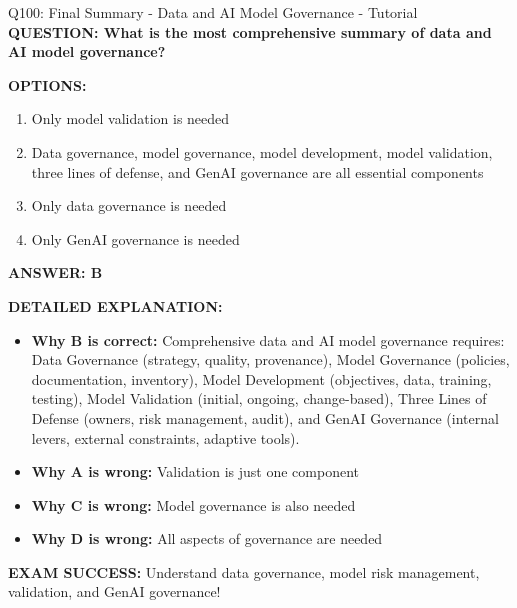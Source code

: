 \documentclass[8pt]{beamer}
\begin{document}
	\begin{frame}{Q100: Final Summary - Data and AI Model Governance - Tutorial}
		\fontsize{6.5}{7.5}\selectfont
		\textbf{QUESTION: What is the most comprehensive summary of data and AI model governance?}
		
		\vspace{0.1cm}
		\textbf{OPTIONS:}
		\begin{enumerate}
			\item Only model validation is needed
			\item Data governance, model governance, model development, model validation, three lines of defense, and GenAI governance are all essential components
			\item Only data governance is needed
			\item Only GenAI governance is needed
		\end{enumerate}
		
		\vspace{0.1cm}
		\textcolor{myblue}{\textbf{ANSWER: B}}
		
		\vspace{0.1cm}
		\textbf{DETAILED EXPLANATION:}
		\begin{itemize}
			\item \textbf{Why B is correct:} Comprehensive data and AI model governance requires: Data Governance (strategy, quality, provenance), Model Governance (policies, documentation, inventory), Model Development (objectives, data, training, testing), Model Validation (initial, ongoing, change-based), Three Lines of Defense (owners, risk management, audit), and GenAI Governance (internal levers, external constraints, adaptive tools).
			\item \textbf{Why A is wrong:} Validation is just one component
			\item \textbf{Why C is wrong:} Model governance is also needed
			\item \textbf{Why D is wrong:} All aspects of governance are needed
		\end{itemize}
		
		\textcolor{myred}{\textbf{EXAM SUCCESS:}} Understand \textcolor{myblue}{data governance, model risk management, validation, and GenAI governance}!
	\end{frame}
	
\end{document}
